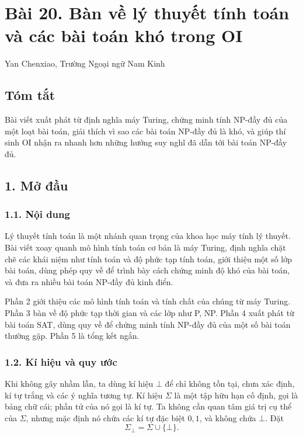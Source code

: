 \documentclass[11pt]{article}
\begin{document}
\section*{Bài 20. Bàn về lý thuyết tính toán và các bài toán khó trong OI}

\begin{center}
Yan Chenxiao, Trường Ngoại ngữ Nam Kinh
\end{center}

\subsection*{Tóm tắt}

Bài viết xuất phát từ định nghĩa máy Turing, chứng minh tính NP-đầy đủ của một
loạt bài toán, giải thích vì sao các bài toán NP-đầy đủ là khó, và giúp thí
sinh OI nhận ra nhanh hơn những hướng suy nghĩ đã dẫn tới bài toán NP-đầy đủ.

\subsection*{1. Mở đầu}

\subsubsection*{1.1. Nội dung}

Lý thuyết tính toán là một nhánh quan trọng của khoa học máy tính lý thuyết.
Bài viết xoay quanh mô hình tính toán cơ bản là máy Turing, định nghĩa chặt chẽ
các khái niệm như tính toán và độ phức tạp tính toán, giới thiệu một số lớp bài
toán, dùng phép quy về để trình bày cách chứng minh độ khó của bài toán, và đưa
ra nhiều bài toán NP-đầy đủ kinh điển.

Phần 2 giới thiệu các mô hình tính toán và tính chất của chúng từ máy Turing.
Phần 3 bàn về độ phức tạp thời gian và các lớp như P, NP. Phần 4 xuất phát từ
bài toán SAT, dùng quy về để chứng minh tính NP-đầy đủ của một số bài toán
thường gặp. Phần 5 là tổng kết ngắn.

\subsubsection*{1.2. Kí hiệu và quy ước}

Khi không gây nhầm lẫn, ta dùng kí hiệu \(\bot\) để chỉ không tồn tại, chưa xác
định, kí tự trắng và các ý nghĩa tương tự. Kí hiệu \(\Sigma\) là một tập hữu
hạn cố định, gọi là bảng chữ cái; phần tử của nó gọi là kí tự. Ta không cần
quan tâm giá trị cụ thể của \(\Sigma\), nhưng mặc định nó chứa các kí tự đặc
biệt \(0,1\), và không chứa \(\bot\). Đặt
\[
  \Sigma_{\bot}=\Sigma\cup\{\bot\}.
\]
\end{document}

